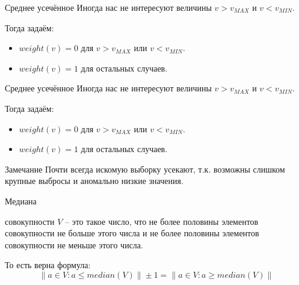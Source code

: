 \begin{frame}[fragile,t]{Среднее усечённое}
	Иногда нас не интересуют величины $v>v_{MAX}$ и $v<v_{MIN}$.
	
	Тогда задаём:
	\begin{itemize}
		\item $weight(v)=0$ для $v>v_{MAX}$ или $v<v_{MIN}$.
		\item $weight(v)=1$ для остальных случаев. 
	\end{itemize}
	
	
	
\end{frame}

\begin{frame}[fragile,t]{Среднее усечённое}
	Иногда нас не интересуют величины $v>v_{MAX}$ и $v<v_{MIN}$.
	
	Тогда задаём:
	\begin{itemize}
		\item $weight(v)=0$ для $v>v_{MAX}$ или $v<v_{MIN}$.
		\item $weight(v)=1$ для остальных случаев. 
	\end{itemize}
	
	
	\begin{block}{Замечание}
	Почти всегда искомую выборку усекают, 
	т.к. возможны слишком крупные выбросы и аномально низкие значения.
	\end{block}
	
\end{frame}




\begin{frame}{Медиана}
	
	 совокупности $V$  -- это такое число, 
	что не более половины элементов совокупности не больше этого числа
	и не более половины элементов совокупности не меньше этого числа.
	
	То есть верна формула:
	\begin{equation}
	 \lVert a \in V: a \leqslant median(V) \rVert  \pm 1 =  \lVert  a \in V: a \geqslant median(V) \rVert
	\end{equation}
	
	
\end{frame}


